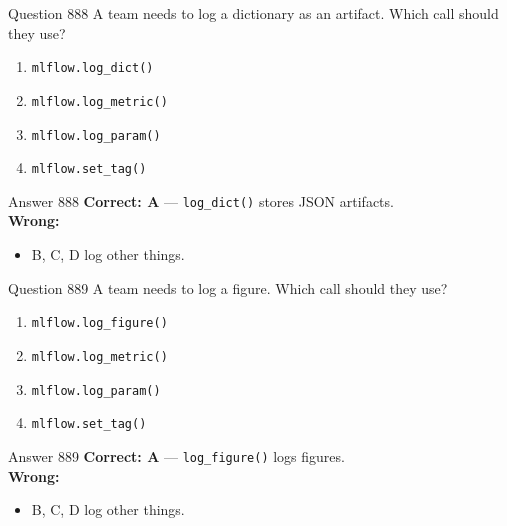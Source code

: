 \documentclass[aspectratio=169,11pt]{beamer}
\begin{document}
	\begin{frame}{Question 888}
		A team needs to log a dictionary as an artifact. Which call should they use?
		\begin{enumerate}[label=\Alph*.]
			\item \texttt{mlflow.log\_dict()}
			\item \texttt{mlflow.log\_metric()}
			\item \texttt{mlflow.log\_param()}
			\item \texttt{mlflow.set\_tag()}
		\end{enumerate}
	\end{frame}
	\begin{frame}{Answer 888}
		\textbf{Correct: A} --- \texttt{log\_dict()} stores JSON artifacts.\\
		\vspace{0.5em}
		\textbf{Wrong:}
		\begin{itemize}
			\item B, C, D log other things.
		\end{itemize}
	\end{frame}
	
	\begin{frame}{Question 889}
		A team needs to log a figure. Which call should they use?
		\begin{enumerate}[label=\Alph*.]
			\item \texttt{mlflow.log\_figure()}
			\item \texttt{mlflow.log\_metric()}
			\item \texttt{mlflow.log\_param()}
			\item \texttt{mlflow.set\_tag()}
		\end{enumerate}
	\end{frame}
	\begin{frame}{Answer 889}
		\textbf{Correct: A} --- \texttt{log\_figure()} logs figures.\\
		\vspace{0.5em}
		\textbf{Wrong:}
		\begin{itemize}
			\item B, C, D log other things.
		\end{itemize}
	\end{frame}
	
\end{document}
